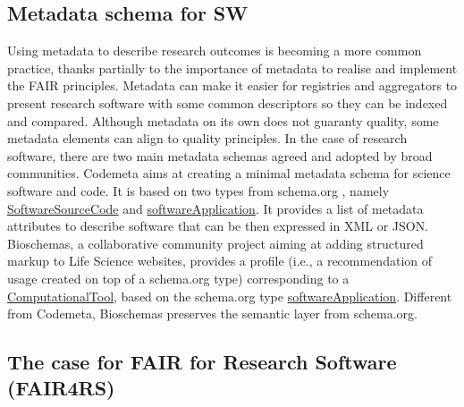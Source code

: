 

\subsection{Metadata schema for SW}

Using metadata to describe research outcomes is becoming a more common practice, thanks partially to the importance of metadata to realise and implement the FAIR principles. Metadata can make it easier for registries and aggregators to present research software with some common descriptors so they can be indexed and compared. Although metadata on its own does not guaranty quality, some metadata elements can align to quality principles. In the case of research software, there are two main metadata schemas agreed and adopted by broad communities. Codemeta \cite{Boettigeral2017} aims at creating a minimal metadata schema for science software and code. It is based on two types from schema.org \cite{guha_schemaorg_2016}, namely \href{https://schema.org/SoftwareSourceCode}{SoftwareSourceCode} and \href{https://schema.org/SoftwareApplication}{softwareApplication}. It provides a list of metadata attributes to describe software that can be then expressed in XML or JSON. Bioschemas, a collaborative community project aiming at adding structured markup to Life Science websites, provides a profile (i.e., a recommendation of usage created on top of a schema.org type) corresponding to a \href{https://bioschemas.org/profiles/ComputationalTool}{ComputationalTool}, based on the schema.org type \href{https://schema.org/SoftwareApplication}{softwareApplication}. Different from Codemeta, Bioschemas preserves the semantic layer from schema.org.


\subsection{The case for FAIR for Research Software (FAIR4RS)}

